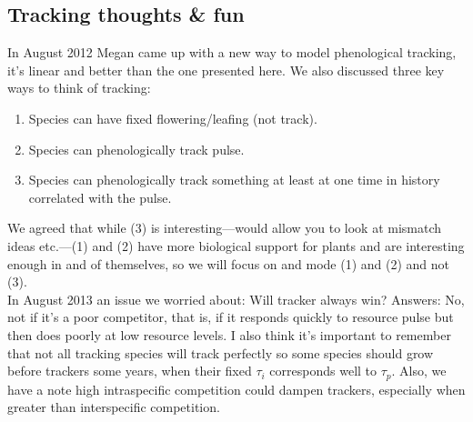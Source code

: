 \documentclass[11pt,a4paper,oneside]{article}
\begin{document}
\subsection{Tracking thoughts \& fun}
In August 2012 Megan came up with a new way to model phenological tracking, it's linear and better than the one presented here. We also discussed three key ways to think of tracking:
\begin{enumerate}
\item Species can have fixed flowering/leafing (not track).
\item Species can phenologically track pulse.
\item Species can phenologically track something at least at one time in history correlated with the pulse.
\end{enumerate}
We agreed that while (3) is interesting---would allow you to look at mismatch ideas etc.---(1) and (2) have more biological support for plants and are interesting enough in and of themselves, so we will focus on and mode (1) and (2) and not (3).\\

\noindent In August 2013 an issue we worried about: Will tracker always win? Answers: No, not if it's a poor competitor, that is, if it responds quickly to resource pulse but then does poorly at low resource levels. I also think it's important to remember that not all tracking species will track perfectly so some species should grow before trackers some years, when their fixed \(\tau_{i}\) corresponds well to \(\tau_{p}\). Also, we have a note high intraspecific competition could dampen trackers, especially when greater than interspecific competition.\\
\end{document}
